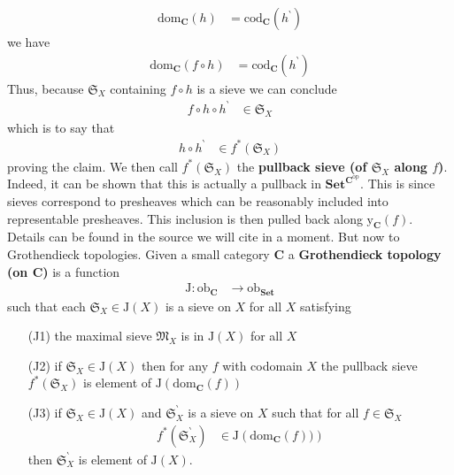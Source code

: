 \begin{exa}
\begin{align*}
  \mathrm{dom}_{\mathbf{C}}(h)
  &=
  \mathrm{cod}_{\mathbf{C}}(h^{\backprime})
\end{align*}
we have
\begin{align*}
  \mathrm{dom}_{\mathbf{C}}(f \circ h)
  &=
  \mathrm{cod}_{\mathbf{C}}(h^{\backprime})
\end{align*}
Thus, because $\mathfrak{S}_{X}$ containing $f \circ h$ is a sieve we can conclude
\begin{align*}
  f
  \circ
  h
  \circ
  h^{\backprime}
  &\in
  \mathfrak{S}_{X}
\end{align*}
which is to say that
\begin{align*}
  h
  \circ
  h^{\backprime}
  &\in
  f^{\ast}(\mathfrak{S}_{X})
\end{align*}
proving the claim. We then call $f^{\ast}(\mathfrak{S}_{X})$ the \textbf{pullback sieve (of $\mathfrak{S}_{X}$ along $f$)}. Indeed, it can be shown that this is actually a pullback in $\mathbf{Set}^{\mathbf{C}^{\mathrm{op}}}$. This is since sieves correspond to presheaves which can be reasonably included into representable presheaves. This inclusion is then pulled back along $\mathrm{y}_{\mathbf{C}}(f)$. Details can be found in the source we will cite in a moment. But now to Grothendieck topologies. Given a small category $\mathbf{C}$ a \textbf{Grothendieck topology (on $\mathbf{C}$)} is a function
\begin{align*}
  \mathrm{J}
  \colon
  \mathrm{ob}_{\mathbf{C}}
  &\rightarrow
  \mathrm{ob}_{\mathbf{Set}}
\end{align*}
such that each $\mathfrak{S}_{X} \in \mathrm{J}(X)$ is a sieve on $X$ for all $X$ satisfying
\begin{enumerate}
\item[(J1)]
the maximal sieve $\mathfrak{M}_{X}$ is in $\mathrm{J}(X)$ for all $X$
\item[(J2)]
if $\mathfrak{S}_{X} \in \mathrm{J}(X)$ then for any $f$ with codomain $X$ the pullback sieve $f^{\ast}(\mathfrak{S}_{X})$ is element of $\mathrm{J}(\mathrm{dom}_{\mathbf{C}}(f))$
\item[(J3)]
if $\mathfrak{S}_{X} \in \mathrm{J}(X)$ and $\mathfrak{S}_{X}^{\backprime}$ is a sieve on $X$ such that for all $f \in \mathfrak{S}_{X}$
\begin{align*}
  f^{\ast}
  \left(
    \mathfrak{S}_{X}^{\backprime}
  \right)
  &\in
  \mathrm{J}
  \left(
    \mathrm{dom}_{\mathbf{C}}(f))
  \right)
\end{align*}
then $\mathfrak{S}_{X}^{\backprime}$ is element of $\mathrm{J}(X)$.

\end{enumerate}
\end{exa}

